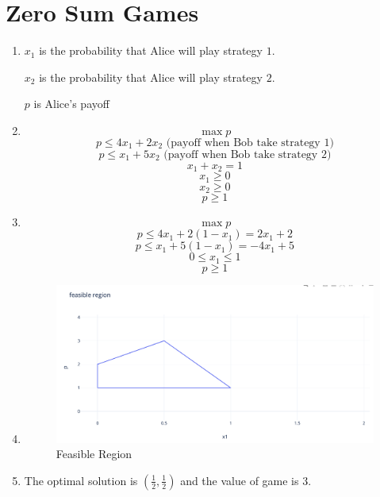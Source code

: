 \documentclass[11pt]{article}
\newenvironment{qparts}{\begin{enumerate}[{(}a{)}]}{\end{enumerate}}
\begin{document}
\section{Zero Sum Games}
\begin{qparts}
	\item 
	
	$x_1$ is the probability that Alice will play strategy $1$. 
	
	$x_2$ is the probability that Alice will play strategy $2$.
	
	$p$ is Alice's payoff
	
	\item
	
	\[
		\max p
	\]
	\[
		p \le 4x_1 +2x_2 \text{ (payoff when Bob take strategy 1)}
	\]
	\[
		p \le x_1 +5x_2 \text{ (payoff when Bob take strategy 2)}
	\]
	\[
		x_1 + x_2 = 1
	\]
	\[
		x_1 \ge 0
	\]
	\[
		x_2 \ge 0
	\]
	\[
		p \ge 1
	\]
	
	\item
	
	\[
		\max p
	\]
	\[
		p \le 4x_1 +2(1 - x_1) = 2x_1 + 2
	\]
	\[
		p \le x_1 +5(1 - x_1) = -4x_1 + 5
	\]
	\[
		0 \le x_1 \le 1
	\]
	\[
		p \ge 1
	\]
	
	\item \text{ }
	
	\begin{figure}[h]
	\centering
	\includegraphics[width=.8\textwidth]{feasible_region.png}
	\caption{\label{fig:feasible_region}Feasible Region}
	\end{figure}
	
	\item
	
	The optimal solution is $(\frac{1}{2}, \frac{1}{2})$ and the value of game is 3.
	
\end{qparts}




\newpage
\end{document}
